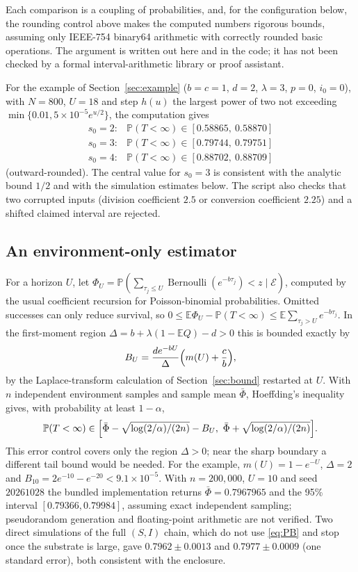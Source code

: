 \documentclass[11pt,a4paper]{article}
\numberwithin{equation}{section}
\theoremstyle{definition}\newtheorem{definition}[theorem]{Definition}
\theoremstyle{remark}\newtheorem{remark}[theorem]{Remark}\newtheorem{example}[theorem]{Example}
\newcommand{\E}{\mathbb E}
\renewcommand{\P}{\mathbb P}
\newcommand{\Ber}{\operatorname{Bernoulli}}
\begin{document}
Each comparison is a coupling of probabilities, and, for the configuration below, the rounding control above makes the computed numbers rigorous bounds, assuming only IEEE-754 binary64 arithmetic with correctly rounded basic operations. The argument is written out here and in the code; it has not been checked by a formal interval-arithmetic library or proof assistant.

For the example of Section~\ref{sec:example} ($b=c=1$, $d=2$, $\lambda=3$, $p=0$, $i_0=0$), with $N=800$, $U=18$ and step $h(u)$ the largest power of two not exceeding $\min\{0.01,5\times10^{-5}e^{u/2}\}$, the computation gives
\[
\begin{array}{lll}
s_0=2: & \P(T<\infty)\in[0.58865,\ 0.58870]\\
s_0=3: & \P(T<\infty)\in[0.79744,\ 0.79751]\\
s_0=4: & \P(T<\infty)\in[0.88702,\ 0.88709]
\end{array}
\]
(outward-rounded). The central value for $s_0=3$ is consistent with the analytic bound $1/2$ and with the simulation estimates below. The script also checks that two corrupted inputs (division coefficient $2.5$ or conversion coefficient $2.25$) and a shifted claimed interval are rejected.

\subsection{An environment-only estimator}\label{sec:estimator}
For a horizon $U$, let $\Phi_U=\P(\sum_{\tau_j\le U}\Ber(e^{-b\tau_j})<z\mid\mathcal E)$, computed by the usual coefficient recursion for Poisson-binomial probabilities. Omitted successes can only reduce survival, so $0\le\E\Phi_U-\P(T<\infty)\le\E\sum_{\tau_j>U}e^{-b\tau_j}$. In the first-moment region $\Delta=b+\lambda(1-\E Q)-d>0$ this is bounded exactly by
\begin{equation}\label{eq:bias}
B_U=\frac{de^{-bU}}{\Delta}\Bigl(m(U)+\frac cb\Bigr),
\end{equation}
by the Laplace-transform calculation of Section~\ref{sec:bound} restarted at $U$. With $n$ independent environment samples and sample mean $\bar\Phi$, Hoeffding's inequality gives, with probability at least $1-\alpha$,
\[
\P(T<\infty)\in\Bigl[\bar\Phi-\sqrt{\log(2/\alpha)/(2n)}-B_U,\ \bar\Phi+\sqrt{\log(2/\alpha)/(2n)}\Bigr].
\]
This error control covers only the region $\Delta>0$; near the sharp boundary a different tail bound would be needed. For the example, $m(U)=1-e^{-U}$, $\Delta=2$ and $B_{10}=2e^{-10}-e^{-20}<9.1\times10^{-5}$. With $n=200{,}000$, $U=10$ and seed $20261028$ the bundled implementation returns $\bar\Phi=0.7967965$ and the 95\% interval $[0.79366,0.79984]$, assuming exact independent sampling; pseudorandom generation and floating-point arithmetic are not verified. Two direct simulations of the full $(S,I)$ chain, which do not use \eqref{eq:PB} and stop once the substrate is large, gave $0.7962\pm0.0013$ and $0.7977\pm0.0009$ (one standard error), both consistent with the enclosure.
\end{document}
